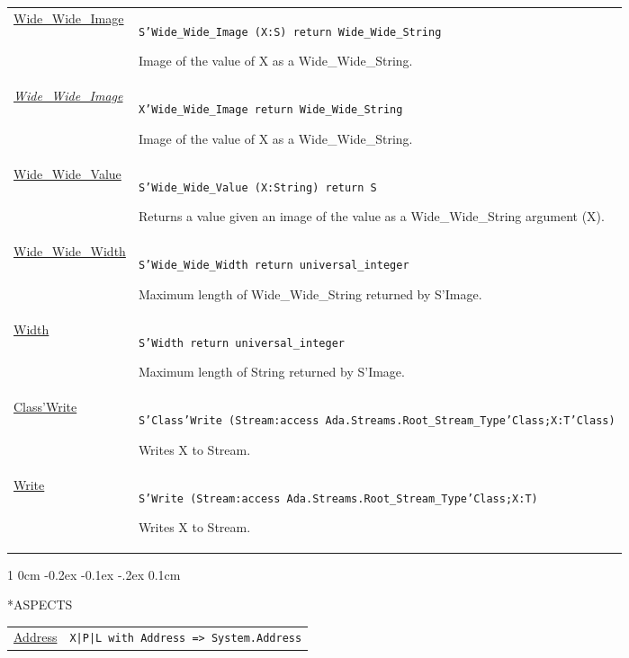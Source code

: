 \documentclass[english]{article}
\makeatletter
\renewcommand\section{%
   \@startsection{section}%
   {1}%
   {0cm}%
   {-0.2ex \@plus -0.1ex \@minus -.2ex}%
   {0.1cm}%
{\raggedright\normalfont\normalsize\bfseries}%
}
\makeatother
\begin{document}
\begin{scriptsize}
\begin{multicols*}{3}
\begin{tabular}{@{}p{2cm}p{6.5cm}}
   \href{http://www.ada-auth.org/standards/22rm/html/RM-K-2.html}{Wide\_Wide\_Image} & \texttt{S'Wide\_Wide\_Image (X:S) return Wide\_Wide\_String}

   Image of the value of X as a Wide\_Wide\_String.\\

   \href{http://www.ada-auth.org/standards/22rm/html/RM-K-2.html}{\textit{Wide\_Wide\_Image}} & \texttt{X'Wide\_Wide\_Image return Wide\_Wide\_String}

   Image of the value of X as a Wide\_Wide\_String.\\

   \href{http://www.ada-auth.org/standards/22rm/html/RM-K-2.html}{Wide\_Wide\_Value} & \texttt{S'Wide\_Wide\_Value (X:String) return S}

   Returns a value given an image of the value as a Wide\_Wide\_String argument (X).\\

   \href{http://www.ada-auth.org/standards/22rm/html/RM-K-2.html}{Wide\_Wide\_Width} & \texttt{S'Wide\_Wide\_Width return universal\_integer}

   Maximum length of Wide\_Wide\_String returned by S'Image.\\

   \href{http://www.ada-auth.org/standards/22rm/html/RM-K-2.html}{Width} & \texttt{S'Width return universal\_integer}

   Maximum length of String returned by S'Image.\\

   \href{http://www.ada-auth.org/standards/22rm/html/RM-K-2.html}{Class'Write} & \texttt{S'Class'Write (Stream:access Ada.Streams.Root\_Stream\_Type'Class;X:T'Class)}

   Writes X to Stream.\\

   \href{http://www.ada-auth.org/standards/22rm/html/RM-K-2.html}{Write} & \texttt{S'Write (Stream:access Ada.Streams.Root\_Stream\_Type'Class;X:T)}

   Writes X to Stream.\\

\end{tabular}

\section*{ASPECTS}
\raggedright
\renewcommand{\arraystretch}{1.5}
\begin{tabular}{@{}p{2cm}p{6.5cm}}
   \href{http://www.ada-auth.org/standards/22rm/html/RM-13-3.html}{Address} & \texttt{X|P|L with Address => System.Address}


\end{tabular}
\end{multicols*}
\end{scriptsize}
\end{document}
